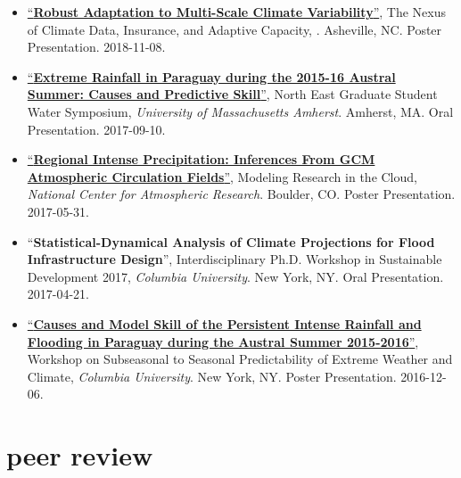 \documentclass[10pt,oneside]{article}
\begin{document}
\begin{itemize}[label={}]
  \item \href{https://doi.org/10.6084/m9.figshare.8277002.v1}{\enquote{\textbf{Robust Adaptation to Multi-Scale Climate Variability}}}, The Nexus of Climate Data, Insurance, and Adaptive Capacity,  . Asheville, NC. Poster Presentation. 2018-11-08.
  
  \item \href{https://doi.org/10.6084/m9.figshare.8277128.v2}{\enquote{\textbf{Extreme Rainfall in Paraguay during the 2015-16 Austral Summer: Causes and Predictive Skill}}}, North East Graduate Student Water Symposium,  \textit{University of Massachusetts Amherst}. Amherst, MA. Oral Presentation. 2017-09-10.
  
  \item \href{https://doi.org/10.6084/m9.figshare.8277167.v1}{\enquote{\textbf{Regional Intense Precipitation: Inferences From GCM Atmospheric Circulation Fields}}}, Modeling Research in the Cloud,  \textit{National Center for Atmospheric Research}. Boulder, CO. Poster Presentation. 2017-05-31.
  
  \item \enquote{\textbf{Statistical-Dynamical Analysis of Climate Projections for Flood Infrastructure Design}}, Interdisciplinary Ph.D. Workshop in Sustainable Development 2017,  \textit{Columbia University}. New York, NY. Oral Presentation. 2017-04-21.
  
  \item \href{https://doi.org/10.13140/RG.2.2.20146.30406}{\enquote{\textbf{Causes and Model Skill of the Persistent Intense Rainfall and Flooding in Paraguay during the Austral Summer 2015-2016}}}, Workshop on Subseasonal to Seasonal Predictability of Extreme Weather and Climate,  \textit{Columbia University}. New York, NY. Poster Presentation. 2016-12-06.
  
\end{itemize}


\section{peer review}

\mbox{}\vspace{-\dimexpr\baselineskip\relax}
\end{document}
